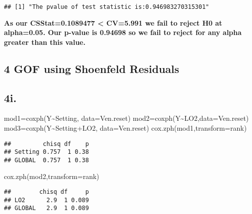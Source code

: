 \documentclass[
]{article}
\newenvironment{Shaded}{\begin{snugshade}}{\end{snugshade}}
\newcommand{\AttributeTok}[1]{\textcolor[rgb]{0.77,0.63,0.00}{#1}}
\newcommand{\FunctionTok}[1]{\textcolor[rgb]{0.00,0.00,0.00}{#1}}
\newcommand{\NormalTok}[1]{#1}
\newcommand{\OtherTok}[1]{\textcolor[rgb]{0.56,0.35,0.01}{#1}}
\newcommand{\SpecialCharTok}[1]{\textcolor[rgb]{0.00,0.00,0.00}{#1}}
\begin{document}
\begin{verbatim}
## [1] "The pvalue of test statistic is:0.946983270315301"
\end{verbatim}

\textbf{As our CSStat=0.1089477 \textless{} CV=5.991 we fail to reject
H0 at alpha=0.05. Our p-value is 0.94698 so we fail to reject for any
alpha greater than this value.}

\hypertarget{gof-using-shoenfeld-residuals}{%
\subsection{4 GOF using Shoenfeld
Residuals}\label{gof-using-shoenfeld-residuals}}

\hypertarget{i.}{%
\subsection{4i.}\label{i.}}

\begin{Shaded}
\begin{Highlighting}[]
\NormalTok{mod1}\OtherTok{=}\FunctionTok{coxph}\NormalTok{(Y}\SpecialCharTok{\textasciitilde{}}\NormalTok{Setting, }\AttributeTok{data=}\NormalTok{Ven.reset)}
\NormalTok{mod2}\OtherTok{=}\FunctionTok{coxph}\NormalTok{(Y}\SpecialCharTok{\textasciitilde{}}\NormalTok{LO2,}\AttributeTok{data=}\NormalTok{Ven.reset)}
\NormalTok{mod3}\OtherTok{=}\FunctionTok{coxph}\NormalTok{(Y}\SpecialCharTok{\textasciitilde{}}\NormalTok{Setting}\SpecialCharTok{+}\NormalTok{LO2, }\AttributeTok{data=}\NormalTok{Ven.reset)}
\FunctionTok{cox.zph}\NormalTok{(mod1,}\AttributeTok{transform=}\NormalTok{rank)}
\end{Highlighting}
\end{Shaded}

\begin{verbatim}
##         chisq df    p
## Setting 0.757  1 0.38
## GLOBAL  0.757  1 0.38
\end{verbatim}

\begin{Shaded}
\begin{Highlighting}[]
\FunctionTok{cox.zph}\NormalTok{(mod2,}\AttributeTok{transform=}\NormalTok{rank)}
\end{Highlighting}
\end{Shaded}

\begin{verbatim}
##        chisq df     p
## LO2      2.9  1 0.089
## GLOBAL   2.9  1 0.089
\end{verbatim}
\end{document}

